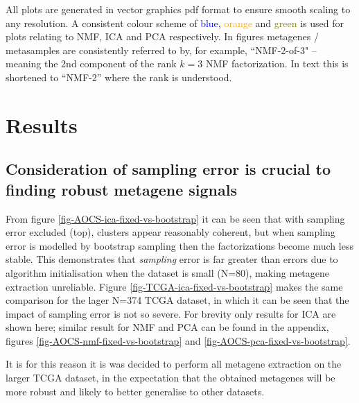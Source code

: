 \documentclass[tikz, 12pt,a4paper,oneside,fleqn]{article}
\begin{document}
All plots are generated in vector graphics pdf format to ensure smooth scaling to any resolution.  A consistent colour scheme of \textcolor{blue}{blue}, \textcolor{orange}{orange} and \textcolor{olive}{green} is used for plots relating to NMF, ICA and PCA respectively.  In figures metagenes / metasamples are consistently referred to by, for example, ``NMF-2-of-3" -- meaning the 2nd component of the rank $k=3$ NMF factorization.  In text this is shortened to ``NMF-2'' where the rank is understood.


\clearpage

\section{Results}


\subsection{Consideration of sampling error is crucial to finding robust metagene signals}

From figure \ref{fig-AOCS-ica-fixed-vs-bootstrap} it can be seen that with sampling error excluded (top), clusters appear reasonably coherent, but when sampling error is modelled by bootstrap sampling then  the factorizations become much less stable.  This demonstrates that \emph{sampling} error is far greater than errors due to algorithm initialisation when the dataset is small (N=80), making metagene extraction unreliable.   Figure  \ref{fig-TCGA-ica-fixed-vs-bootstrap} makes the same comparison for the lager N=374 TCGA dataset, in which it can be seen that the impact of sampling error is not so severe.  For brevity only results for ICA are shown here; similar result for NMF and PCA can be found in the appendix, figures \ref{fig-AOCS-nmf-fixed-vs-bootstrap} and \ref{fig-AOCS-pca-fixed-vs-bootstrap}.

It is for this reason it is was decided to perform all metagene extraction on the larger TCGA dataset, in the expectation that the obtained metagenes will be more robust and likely to better generalise to other datasets.
\end{document}
